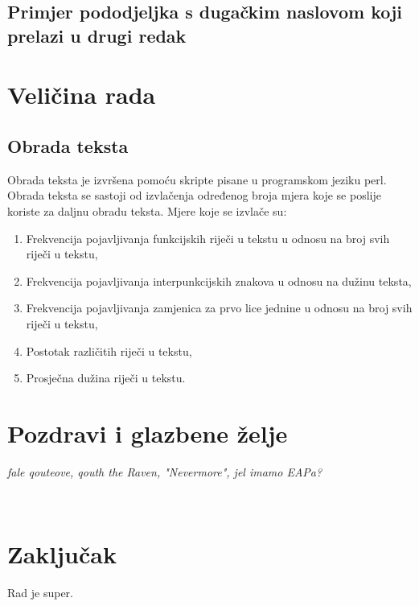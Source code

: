 \documentclass[10pt, a4paper]{article}
\begin{document}
\subsection{Primjer pododjeljka s dugačkim naslovom koji prelazi u
drugi redak}



\section{Veličina rada}



\subsection{Obrada teksta}



Obrada teksta je izvršena pomoću skripte pisane u programskom jeziku perl. Obrada teksta se sastoji od izvlačenja određenog broja mjera koje se poslije koriste za daljnu obradu teksta.
Mjere koje se izvlače su:
\begin{enumerate}
\item Frekvencija pojavljivanja funkcijskih riječi u tekstu u odnosu na broj svih riječi u tekstu,
\item Frekvencija pojavljivanja interpunkcijskih znakova u odnosu na dužinu teksta,
\item Frekvencija pojavljivanja zamjenica za prvo lice jednine u odnosu na broj svih riječi u tekstu,
\item Postotak različitih riječi u tekstu,
\item Prosječna dužina riječi u tekstu.
\end{enumerate}





\section{Pozdravi i glazbene želje}

\emph{fale qouteove, qouth the Raven, "Nevermore", jel imamo EAPa?}

\

\section{Zaključak}

Rad je super.




 
\end{document}

